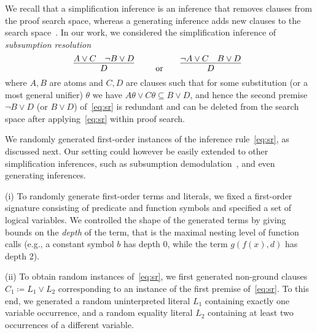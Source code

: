 We recall that a simplification inference is an inference
that removes clauses from the proof search space, whereas a generating
inference adds new clauses to the search space~\cite{Vampire13}. In our work, we
considered the simplification inference of 
\emph{subsumption resolution} 
\begin{equation}\label{eq:sr}
    \infer[]{
      D
      }{
      A\vee C
      &
      {\neg B \vee D}
    }
    \qquad \text{or}\qquad
    \infer[]{
      D
      }{
      \neg A\vee C
      &
      {B \vee D}
    }
      \end{equation}
      where $A,B$ are atoms and $C,D$ are clauses
      such that for some substitution (or a most general unifier) $\theta$ we have $A\theta\vee
C\theta\subseteq B\vee D$, and hence the second premise $\neg B \vee
D$ (or $B \vee
D$) of~\eqref{eq:sr} is redundant and can  be deleted from the search
space after applying~\eqref{eq:sr} within proof search.

We randomly generated first-order instances of the inference rule~\eqref{eq:sr}, as
discussed next. Our setting could however be easily extended to other
simplification inferences, such as subsumption demodulation~\cite{Rath20},
and even generating inferences.

\noindent (i) To randomly generate first-order terms and literals,
we fixed a first-order signature consisting of %
predicate and function symbols and specified a set of logical
variables. 
We controlled the shape of the generated terms
by giving bounds on the \emph{depth} of the term,
that is the maximal nesting level of function calls
(e.g., a constant symbol $b$ has depth 0, while the term $g(f(x),d)$ has depth 2).\smallskip


\noindent (ii)  To obtain random instances of~\eqref{eq:sr}, 
we first generated non-ground clauses $C_1 \coloneqq L_1 \lor L_2$
corresponding to an instance of the first premise of~\eqref{eq:sr}.
To this end, we generated a random uninterpreted literal $L_1$ containing exactly one variable occurrence,
and a random equality literal $L_2$ containing at least two occurrences of a different variable.\smallskip

